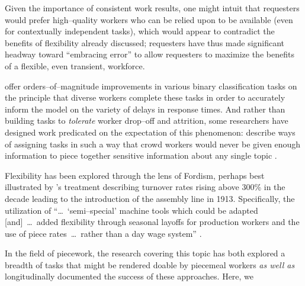 \documentclass[trackingWork]{subfiles}
\begin{document}
Given the importance of consistent work results, one might intuit that
requesters would prefer high--quality workers who can be relied upon to be available
(even for contextually independent tasks),
which would appear to contradict the benefits of flexibility already discussed;
requesters have thus made significant headway toward
``embracing error'' to allow requesters to maximize the benefits of a flexible,
even transient,
workforce.

\citeauthor{embracingErrorKrishna} offer orders--of--magnitude improvements
in various binary classification tasks
on the principle that diverse workers complete these tasks
in order to accurately inform the model on the variety of delays in response times.
And rather than building tasks to \textit{tolerate} worker drop--off and attrition,
some researchers have designed work predicated on the expectation of this phenomenon:
\citeauthor{sensitiveTasks} describe ways of assigning tasks in such a way that
crowd workers would never be given enough information to piece together sensitive information about
any single topic
\cite{sensitiveTasks}.

Flexibility has been explored through the lens of Fordism, perhaps best illustrated by
\citeauthor{tolliday1986between}'s treatment describing
turnover rates rising above 300\% in the decade leading to the introduction of the assembly line in 1913.
Specifically, the utilization of ``\dots~`semi--special' machine tools which could be adapted
[and]~\dots~added flexibility through seasonal layoffs for production workers and the use of
piece rates~\dots~rather than a day wage system''
\cite{tolliday1986between}.

In the field of piecework,
the research covering this topic has both explored
a breadth of tasks that might be rendered doable by piecemeal workers
\textit{as well as} longitudinally documented the success of these approaches.
Here, we 
\end{document}

